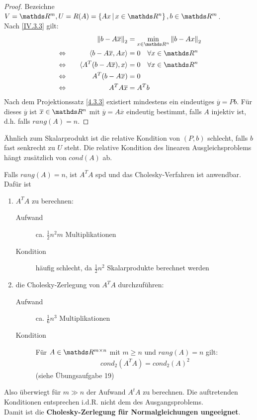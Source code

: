 \begin{proof} Bezeichne
	$V= \R^m, U= R(A) = \left\{Ax \, \middle|  \, x \in\Ren \right\}, b \in \R^m$.\\
	Nach \eqref{IV.3.3} gilt:
	\begin{alignat*}{2}
	&&\nn{b-A\overline{x}}_2 &= \min_{x\in\Ren} \nn{b-Ax}_2 \\
	&\Leftrightarrow \quad & \scp{b-A \overline{x}}{Ax} &= 0 \quad \forall x\in \Ren \\
	&\Leftrightarrow & \scp{A^T(b-A\overline{x})}{x} &= 0 \quad  \forall x\in\Ren \\
	&\Leftrightarrow & A^T(b-A\overline{x}) &= 0 \\
	&\Leftrightarrow & A^TA\overline{x} &= A^Tb
	\end{alignat*}
	Nach dem Projektionssatz \ref{4.3.3} existiert mindestens ein eindeutiges
	$\overline{y} = P b$.
	Für dieses $\overline{y}$ ist $\overline{x}\in \Ren $ mit $\overline{y} = A\overline{x}$
	eindeutig bestimmt, falls $A$ injektiv ist, d.h. falls $rang(A) = n$. 
\end{proof}

Ähnlich zum Skalarprodukt ist die relative Kondition von $(P,b) $ schlecht, 
falls $b$ fast senkrecht zu $U$ steht.
Die relative Kondition des linearen Ausgleichsproblems hängt zusätzlich von $cond(A)$ ab.


Falls $rang(A) = n$, ist $A^TA$ spd und das Cholesky-Verfahren ist anwendbar. \\
Dafür ist
\begin{enumerate}[1.]
	\item $A^TA$ zu berechnen:
	\begin{description}
		\item[Aufwand] ca. $\frac{1}{2}n^2m$ Multiplikationen 
		\item[Kondition] häufig schlecht, da $\frac{1}{2}n^2$ Skalarprodukte berechnet werden
	\end{description}
	\item die Cholesky-Zerlegung von $A^TA $ durchzuführen:
	\begin{description}
		\item[Aufwand] ca. $\frac{1}{6}n^3$ Multiplikationen 
		\item[Kondition] Für $A\in\R^{m\times n}$ mit $m\geq n$ und $rang(A)=n$ gilt:
		\begin{gather}
		cond_2(A^TA) = cond_2(A)^2 \label{IV.3.7}
		\end{gather}
		(siehe Übungsaufgabe 19)
	\end{description}
\end{enumerate}
Also überwiegt für $m\gg n$ der Aufwand $A^tA$ zu berechnen.
Die auftretenden Konditionen entsprechen i.d.R. nicht dem des Ausgangsproblems.\\
Damit ist die 
\textbf{Cholesky-Zerlegung  für Normalgleichungen ungeeignet}.


